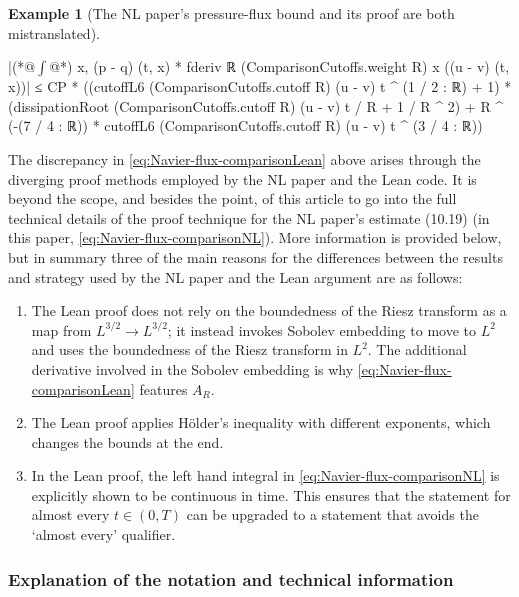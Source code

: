\documentclass[10pt, a4paper, reqno]{amsart}
\numberwithin{equation}{section}
\theoremstyle{definition}
\newtheorem{example}[theorem]{Example}
\theoremstyle{definition}
\begin{document}
\begin{example}[The NL paper's pressure-flux bound and its proof are both mistranslated]
\begin{lstlistingleansmall}
      |(*@\ensuremath{\int}@*) x, (p - q) (t, x) * fderiv ℝ (ComparisonCutoffs.weight R) x ((u - v) (t, x))| ≤ CP *
        ((cutoffL6 (ComparisonCutoffs.cutoff R) (u - v) t ^ (1 / 2 : ℝ) + 1) *
          (dissipationRoot (ComparisonCutoffs.cutoff R) (u - v) t / R + 1 / R ^ 2) +
          R ^ (-(7 / 4 : ℝ)) * cutoffL6 (ComparisonCutoffs.cutoff R) (u - v) t ^ (3 / 4 : ℝ))
\end{lstlistingleansmall}
The discrepancy in \eqref{eq:Navier-flux-comparisonLean} above arises through the diverging proof methods employed by the NL paper and the Lean code. It is beyond the scope, and besides the point, of this article to go into the full technical details of the proof technique for the NL paper's estimate (10.19) (in this paper, \eqref{eq:Navier-flux-comparisonNL}). More information is provided below, but in summary three of the main reasons for the differences between the results and strategy used by the NL paper and the Lean argument are as follows:
\begin{enumerate}
	\item The Lean proof does not rely on the boundedness of the Riesz transform as a map from $L^{3/2} \to L^{3/2}$; it instead invokes Sobolev embedding to move to $L^2$ and uses the boundedness of the Riesz transform in $L^2$. The additional derivative involved in the Sobolev embedding is why \eqref{eq:Navier-flux-comparisonLean} features $A_R$.
	\item The Lean proof applies H\"older's inequality with different exponents, which changes the bounds at the end.
	\item In the Lean proof, the left hand integral in \eqref{eq:Navier-flux-comparisonNL} is explicitly shown to be continuous in time. This ensures that the statement for almost every $t \in (0,T)$ can be upgraded to a statement that avoids the `almost every' qualifier.
\end{enumerate}

\end{example}

\subsubsection{Explanation of the notation and technical information} 
\end{document}
